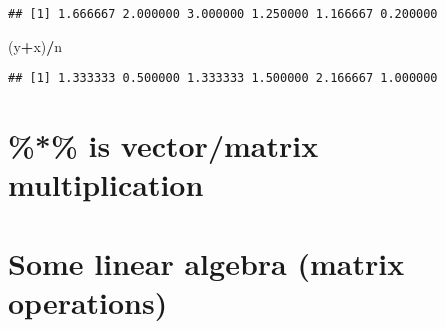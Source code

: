 \documentclass[]{article}
\newenvironment{Shaded}{\begin{snugshade}}{\end{snugshade}}
\newcommand{\KeywordTok}[1]{\textcolor[rgb]{0.13,0.29,0.53}{\textbf{#1}}}
\newcommand{\DecValTok}[1]{\textcolor[rgb]{0.00,0.00,0.81}{#1}}
\newcommand{\StringTok}[1]{\textcolor[rgb]{0.31,0.60,0.02}{#1}}
\newcommand{\OperatorTok}[1]{\textcolor[rgb]{0.81,0.36,0.00}{\textbf{#1}}}
\newcommand{\NormalTok}[1]{#1}
\begin{document}
\begin{verbatim}
## [1] 1.666667 2.000000 3.000000 1.250000 1.166667 0.200000
\end{verbatim}

\begin{Shaded}
\begin{Highlighting}[]
\NormalTok{(y}\OperatorTok{+}\NormalTok{x)}\OperatorTok{/}\NormalTok{n}
\end{Highlighting}
\end{Shaded}

\begin{verbatim}
## [1] 1.333333 0.500000 1.333333 1.500000 2.166667 1.000000
\end{verbatim}

\section{\%*\% is vector/matrix
multiplication}\label{is-vectormatrix-multiplication}

\begin{Shaded}
\end{Shaded}

\section{Some linear algebra (matrix
operations)}\label{some-linear-algebra-matrix-operations}

\begin{Shaded}
\end{Shaded}
\end{document}
